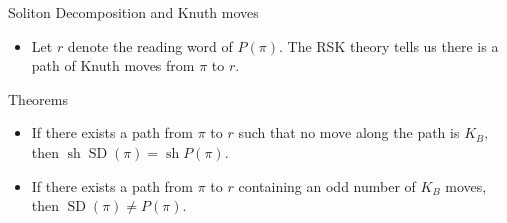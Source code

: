 \documentclass[aspectratio=169, serif]{beamer}
\DeclareMathOperator{\SD}{SD}
\DeclareMathOperator{\sh}{sh}
\begin{document}
\begin{frame}{Soliton Decomposition and Knuth moves}
    \begin{itemize}
            \item Let $r$ denote the reading word of $P(\pi).$ The RSK theory tells us there is a path of Knuth moves from $\pi$ to $r.$
        \end{itemize}
        \begin{alertblock}{Theorems}
        \begin{itemize}
            \item If there exists a path from $\pi$ to $r$ such that no move along the path is $K_B,$ then $\sh\SD(\pi)=\sh P(\pi).$
            \item If there exists a path from $\pi$ to $r$ containing an odd number of $K_B$ moves, then $\SD(\pi)\neq P(\pi).$
        \end{itemize}
    \end{alertblock}
    
\end{frame}
\end{document}

